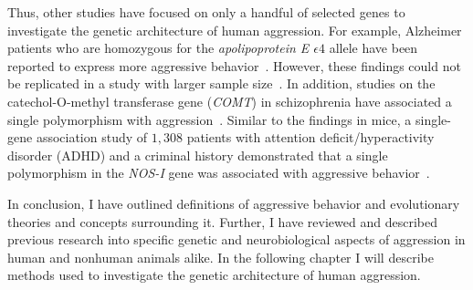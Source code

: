 Thus, other studies have focused on only a handful of selected genes to investigate the genetic architecture of human aggression.
For example, Alzheimer patients who are homozygous for the \textit{apolipoprotein E $\epsilon 4$} allele have been reported to express more aggressive behavior~\cite{Craig2004,VanDerFlier2006}.
However, these findings could not be replicated in a study with larger sample size~\cite{Hollingworth2006}.
In addition, studies on the catechol-O-methyl transferase gene (\textit{COMT}) in schizophrenia have associated a single polymorphism with aggression~\cite{Hirata2013,Calati2011}.
Similar to the findings in mice, a single-gene association study of $1,308$ patients with attention deficit/hyperactivity disorder (ADHD) and a criminal history demonstrated that a single polymorphism in the \textit{NOS-I} gene was associated with aggressive behavior~\cite{Reif2009}.

\bigskip

In conclusion, I have outlined definitions of aggressive behavior and evolutionary theories and concepts surrounding it.
Further, I have reviewed and described previous research into specific genetic and neurobiological aspects of aggression in human and nonhuman animals alike.
In the following chapter I will describe methods used to investigate the genetic architecture of human aggression.

